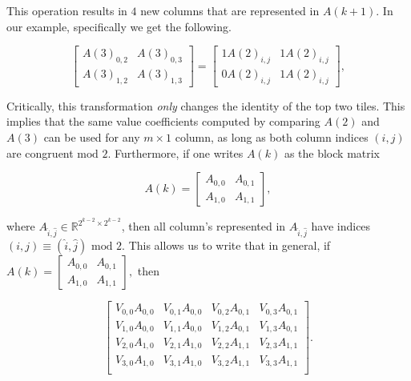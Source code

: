 \documentclass[12pt]{article}
\theoremstyle{plain}
\theoremstyle{definition}
\theoremstyle{remark}
\theoremstyle{definition}
\newcommand{\lablnode}[3]{\node[shape=circle,draw=none,fill=none, inner sep=0pt,minimum size=0pt] (A) at ( #1 , #2 ) {#3};}
\newcommand{\lablvertex}[3]{\node[shape=circle,draw=none,fill=white, inner sep=2pt,minimum size=5pt] (A) at ( #1 , #2 ) {#3};}
\begin{document}
\begin{center}
\end{center}

This operation results in $4$ new columns that are represented in $A(k+1)$. In our example, specifically we get the following. 

$$
\begin{bmatrix} 
    A(3)_{0,2} & A(3)_{0,3} \\ 
    A(3)_{1,2} & A(3)_{1,3} 
\end{bmatrix} = 
\begin{bmatrix} 
    1A(2)_{i,j} & 1A(2)_{i,j} \\ 
    0A(2)_{i,j} & 1A(2)_{i,j} 
\end{bmatrix},
$$

Critically, this transformation \textit{only} changes the identity of the top two tiles. This implies that the same value coefficients computed by comparing $A(2)$ and $A(3)$ can be used for any $m \times 1$ column, as long as both column indices $(i,j)$ are congruent $\text{mod } 2$. Furthermore, if one writes $A(k)$ as the block matrix

$$A(k) = \begin{bmatrix} A_{0,0} & A_{0,1} \\ A_{1,0} & A_{1,1} \end{bmatrix},$$

where $A_{\hat{i},\hat{j}} \in \mathbb{R}^{2^{k-2} \times 2^{k-2}}$, then all column's represented in $A_{\hat{i},\hat{j}}$ have indices $(i,j) \equiv (\hat{i},\hat{j}) \text{ mod } 2$. This allows us to write that in general, if $A(k) = \begin{bmatrix} A_{0,0} & A_{0,1} \\ A_{1,0} & A_{1,1} \end{bmatrix},$
then

\begin{equation}\label{eqn: coefficient matrix prod}
    \begin{bmatrix}
        V_{0,0}A_{0,0} & V_{0,1}A_{0,0} & V_{0,2}A_{0,1} & V_{0,3}A_{0,1} \\
        V_{1,0}A_{0,0} & V_{1,1}A_{0,0} & V_{1,2}A_{0,1} & V_{1,3}A_{0,1} \\
        V_{2,0}A_{1,0} & V_{2,1}A_{1,0} & V_{2,2}A_{1,1} & V_{2,3}A_{1,1} \\
        V_{3,0}A_{1,0} & V_{3,1}A_{1,0} & V_{3,2}A_{1,1} & V_{3,3}A_{1,1} \\
    \end{bmatrix}.
\end{equation}
\end{document}
